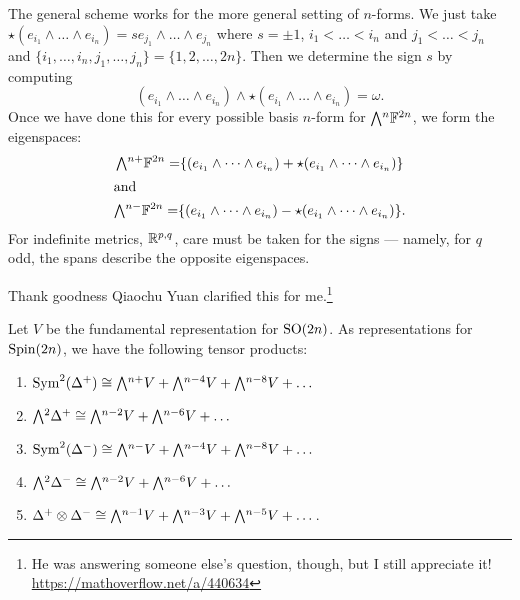 \begin{remark}
The general scheme works for the more general setting of $n$-forms. We
just take $\star (e_{i_{1}}\wedge\dots\wedge e_{i_{n}}) = s e_{j_{1}}\wedge\dots\wedge e_{j_{n}}$
where $s=\pm1$, $i_{1}<\dots<i_{n}$ and $j_{1}<\dots<j_{n}$ and
$\{i_{1},\dots,i_{n},j_{1},\dots,j_{n}\} = \{1,2,\dots,2n\}$.
Then we determine the sign $s$ by computing
\begin{equation}
(e_{i_{1}}\wedge\dots\wedge e_{i_{n}})\wedge\star(e_{i_{1}}\wedge\dots\wedge e_{i_{n}})=\omega.
\end{equation}
Once we have done this for every possible basis $n$-form for
$\Exterior^{n}\FF^{2n}$, we form the eigenspaces:
\begin{subequations}
\begin{align}
\Exterior^{n+}\FF^{2n}=\span\{(e_{i_{1}}\wedge\dots\wedge e_{i_{n}}) + \star (e_{i_{1}}\wedge\dots\wedge e_{i_{n}})\}\\
\intertext{and}
\Exterior^{n-}\FF^{2n}=\span\{(e_{i_{1}}\wedge\dots\wedge e_{i_{n}}) - \star (e_{i_{1}}\wedge\dots\wedge e_{i_{n}})\}.
\end{align}
\end{subequations}
For indefinite metrics, $\mathbb{R}^{p,q}$, care must be taken for the signs
--- namely, for $q$ odd, the spans describe the opposite eigenspaces.
\end{remark}

\begin{remark}
Thank goodness Qiaochu Yuan clarified this for me.\footnote{He was
answering someone else's question, though, but I still appreciate it! \url{https://mathoverflow.net/a/440634}}
\end{remark}

\begin{theorem}
Let $V$ be the fundamental representation for $\operatorname{SO}(2n)$. As
representations for $\operatorname{Spin}(2n)$, we have the following tensor products:
\begin{enumerate}
\item $\Sym^{2}(\Delta^{+}) \iso \Exterior^{n+}V + \Exterior^{n-4}V + \Exterior^{n-8}V+\dots$
\item $\Exterior^{2}\Delta^{+} \iso \Exterior^{n-2}V + \Exterior^{n-6}V + \dots$
\item $\Sym^{2}(\Delta^{-}) \iso \Exterior^{n-}V + \Exterior^{n-4}V + \Exterior^{n-8}V+\dots$
\item $\Exterior^{2}\Delta^{-} \iso \Exterior^{n-2}V + \Exterior^{n-6}V + \dots$
\item $\Delta^{+}\otimes\Delta^{-}\iso\Exterior^{n-1}V + \Exterior^{n-3}V + \Exterior^{n-5}V + \dots$.
\end{enumerate}
\end{theorem}

